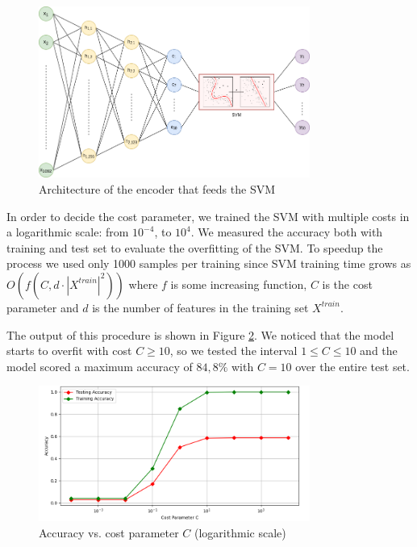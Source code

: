 \documentclass[compsoc]{IEEEtran}
\begin{document}
\begin{figure}[ht!]
\centering                                                                        
\includegraphics[width=3.5in]{svm.png}
\captionsetup{justification=centering}                                                                                       
\caption{Architecture of the encoder that feeds the SVM}
\label{fig:svm}
\end{figure}


In order to decide the cost parameter, we trained the SVM with multiple costs in a logarithmic scale: from $10^{-4}$, to $10^{4}$. We measured the accuracy both with training and test set to evaluate the overfitting of the SVM. To speedup the process we used only 1000 samples per training since SVM training time grows as $O(f(C,  d \cdot |X^{train}|^2))$ where $f$ is some increasing function, $C$ is the cost parameter and $d$ is the number of features in the training set $X^{train}$.\par
The output of this procedure is shown in  Figure \ref{fig:svmacc}. We noticed that the model starts to overfit with cost $C \geq 10$, so we tested the interval $1 \leq C \leq 10$ and the model scored a maximum accuracy of $84,8\%$ with $C=10$ over the entire test set. 


\begin{figure}[ht!]
\centering                                                                        
\includegraphics[width=3.5in]{svmacc.png}
\captionsetup{justification=centering}                                                                                       
\caption{Accuracy vs. cost parameter $C$ (logarithmic scale)}
\label{fig:svmacc}
\end{figure}
\end{document}
